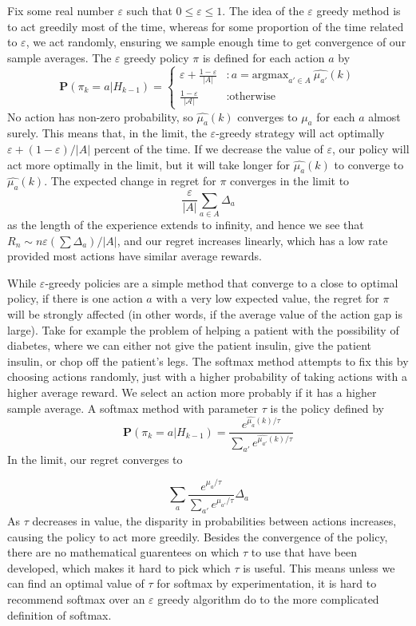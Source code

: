 Fix some real number $\varepsilon$ such that $0 \leq \varepsilon \leq 1$. The idea of the $\varepsilon$ greedy method is to act greedily most of the time, whereas for some proportion of the time related to $\varepsilon$, we act randomly, ensuring we sample enough time to get convergence of our sample averages. The $\varepsilon$ greedy policy $\pi$ is defined for each action $a$ by
%
\[ \mathbf{P}(\pi_k = a | H_{k-1})  =
        \begin{cases} \varepsilon + \frac{1 - \varepsilon}{|A|} &: a = \text{argmax}_{a' \in A}\ \widehat{\mu_{a'}}(k)\\
        \frac{1 - \varepsilon}{|\mathcal{A}|} &: \text{otherwise}
        \end{cases} \]
%
No action has non-zero probability, so $\widehat{\mu_a}(k)$ converges to $\mu_a$ for each $a$ almost surely. This means that, in the limit, the $\varepsilon$-greedy strategy will act optimally $\varepsilon + (1 - \varepsilon)/|A|$ percent of the time. If we decrease the value of $\varepsilon$, our policy will act more optimally in the limit, but it will take longer for $\widehat{\mu_a}(k)$ to converge to $\widehat{\mu_a}(k)$. The expected change in regret for $\pi$ converges in the limit to
%
\[ \frac{\varepsilon}{|A|} \sum_{a \in A} \Delta_a \]
%
as the length of the experience extends to infinity, and hence we see that $R_n \sim n \varepsilon \left( \sum \Delta_a \right)/ |A|$, and our regret increases linearly, which has a low rate provided most actions have similar average rewards.

While $\varepsilon$-greedy policies are a simple method that converge to a close to optimal policy, if there is one action $a$ with a very low expected value, the regret for $\pi$ will be strongly affected (in other words, if the average value of the action gap is large). Take for example the problem of helping a patient with the possibility of diabetes, where we can either not give the patient insulin, give the patient insulin, or chop off the patient's legs. The softmax method attempts to fix this by choosing actions randomly, just with a higher probability of taking actions with a higher average reward. We select an action more probably if it has a higher sample average. A softmax method with parameter $\tau$ is the policy defined by
%
\[ \mathbf{P}(\pi_k = a | H_{k-1}) = \frac{e^{\widehat{\mu_a}(k)/\tau}}{\sum_{a'} e^{\widehat{\mu_{a'}}(k)/\tau}}\]
% 
In the limit, our regret converges to

\[ \sum_a \frac{e^{\mu_a/\tau}}{\sum_{a'} e^{\mu_{a'}/\tau}} \Delta_a \]
%
As $\tau$ decreases in value, the disparity in probabilities between actions increases, causing the policy to act more greedily. Besides the convergence of the policy, there are no mathematical guarentees on which $\tau$ to use that have been developed, which makes it hard to pick which $\tau$ is useful. This means unless we can find an optimal value of $\tau$ for softmax by experimentation, it is hard to recommend softmax over an $\varepsilon$ greedy algorithm do to the more complicated definition of softmax.

